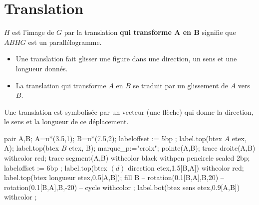 \section{Translation}

\begin{minipage}{0.6\linewidth}
    \begin{definition}
        $H$ est l’image de $G$ par la translation \textbf{qui transforme $\mathbf{A}$ en $\mathbf{B}$} signifie que $ABHG$ est un parallélogramme.
    \end{definition}
\end{minipage}
\begin{minipage}{0.4\linewidth}
    \hspace*{-10mm}
\end{minipage}

\begin{remarques}
    \begin{itemize}
        \item Une translation fait glisser une figure dans une direction, un sens et une longueur donnés.
        \item La translation qui transforme $A$ en $B$ se traduit par un glissement de $A$ vers $B$.
    \end{itemize}
    \smallskip
\end{remarques}

\begin{notation}    
    Une translation est symbolisée par un vecteur (une flèche) qui donne la direction, le sens et la longueur de ce déplacement.
    
    \begin{Geometrie}[CoinHD={(11u,3u)}]
        pair A,B;
        A=u*(3.5,1);
        B=u*(7.5,2);
        labeloffset := 5bp ;
        label.top(btex $A$ etex, A);
        label.top(btex $B$ etex, B);
        marque_p:="croix";
        pointe(A,B);
        trace droite(A,B) withcolor red;
        trace segment(A,B) withcolor black withpen pencircle scaled 2bp;        
        labeloffset := 6bp ;
        label.top(btex $(d)$ direction etex,1.5[B,A]) withcolor red;
        label.top(btex longueur etex,0.5[A,B]);
        fill B -- rotation(0.1[B,A],B,20) -- rotation(0.1[B,A],B,-20) -- cycle withcolor \myMetapostGreen;
        label.bot(btex sens etex,0.9[A,B]) withcolor \myMetapostGreen;
    \end{Geometrie}    
\end{notation}

